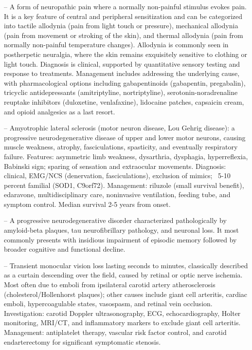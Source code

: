 -- A form of neuropathic pain where a normally non-painful stimulus evokes pain. It is a key feature of central and peripheral sensitization and can be categorized into tactile allodynia (pain from light touch or pressure), mechanical allodynia (pain from movement or stroking of the skin), and thermal allodynia (pain from normally non-painful temperature changes). Allodynia is commonly seen in postherpetic neuralgia, where the skin remains exquisitely sensitive to clothing or light touch. Diagnosis is clinical, supported by quantitative sensory testing and response to treatments. Management includes addressing the underlying cause, with pharmacological options including gabapentinoids (gabapentin, pregabalin), tricyclic antidepressants (amitriptyline, nortriptyline), serotonin-noradrenaline reuptake inhibitors (duloxetine, venlafaxine), lidocaine patches, capsaicin cream, and opioid analgesics as a last resort.

-- Amyotrophic lateral sclerosis (motor neuron disease, Lou Gehrig disease): a progressive neurodegenerative disease of upper and lower motor neurons, causing muscle weakness, atrophy, fasciculations, spasticity, and eventually respiratory failure. Features: asymmetric limb weakness, dysarthria, dysphagia, hyperreflexia, Babinski sign; sparing of sensation and extraocular movements. Diagnosis: clinical, EMG/NCS (denervation, fasciculations), exclusion of mimics; ~5-10 percent familial (SOD1, C9orf72). Management: riluzole (small survival benefit), edaravone, multidisciplinary care, noninvasive ventilation, feeding tube, and symptom control. Median survival 2-5 years from onset.

-- A progressive neurodegenerative disorder characterized pathologically by amyloid-beta plaques, tau neurofibrillary pathology, and neuronal loss. It most commonly presents with insidious impairment of episodic memory followed by broader cognitive and functional decline.

-- Transient monocular vision loss lasting seconds to minutes, classically described as a curtain descending over the field, caused by retinal or optic nerve ischemia. Most often due to emboli from ipsilateral carotid artery atherosclerosis (cholesterol/Hollenhorst plaques); other causes include giant cell arteritis, cardiac emboli, hypercoagulable states, vasospasm, and retinal vein occlusion. Investigation: carotid Doppler ultrasonography, ECG, echocardiography, Holter monitoring, MRI/CT, and inflammatory markers to exclude giant cell arteritis. Management: antiplatelet therapy, vascular risk factor control, and carotid endarterectomy for significant symptomatic stenosis.

